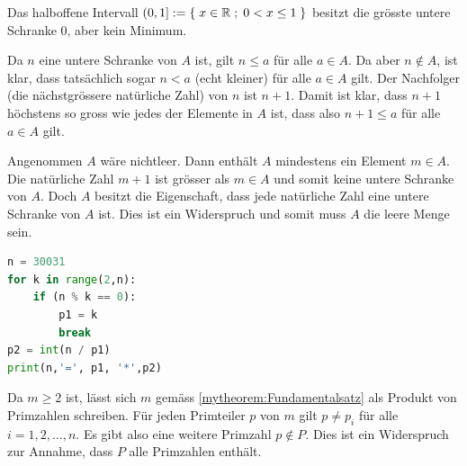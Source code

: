 \clearpage
\begin{myanswer}[myexercise:0298]
	Das halboffene Intervall $\left(0, 1\right] := \left\{\;x\in\mathbb{R} \; ; \; 0<x\leq 1 \;\right\}$ besitzt die grösste untere Schranke $0$, aber kein Minimum.
\end{myanswer}

\begin{myanswer}[myexercise:0297]
	\begin{aenum}
		\item Da $n$ eine untere Schranke von $A$ ist, gilt $n\leq a$ für alle $a\in A$.
		Da aber $n\notin A$, ist klar, dass tatsächlich sogar $n < a$ (echt kleiner) für alle $a\in A$ gilt.
		Der Nachfolger (die nächstgrössere natürliche Zahl) von $n$ ist $n+1$.
		Damit ist klar, dass $n+1$ höchstens so gross wie jedes der Elemente in $A$ ist, dass also $n+1 \leq a$ für alle $a\in A$ gilt.
		\item Angenommen $A$ wäre nichtleer.
		Dann enthält $A$ mindestens ein Element $m\in A$.
		Die natürliche Zahl $m+1$ ist grösser als $m\in A$ und somit keine untere Schranke von $A$.
		Doch $A$ besitzt die Eigenschaft, dass jede natürliche Zahl eine untere Schranke von $A$ ist.
		Dies ist ein Widerspruch und somit muss $A$ die leere Menge sein.
	\end{aenum}
\end{myanswer}
\begin{myanswer}[myexercise:0293]
	\begin{lstlisting}[language=Python]
n = 30031
for k in range(2,n):
    if (n % k == 0):
        p1 = k
        break
p2 = int(n / p1)
print(n,'=', p1, '*',p2)
\end{lstlisting}
\end{myanswer}

\begin{myanswer}[myexercise:0292]
	Da $m\geq 2$ ist, lässt sich $m$ gemäss \cref{mytheorem:Fundamentalsatz} als Produkt von Primzahlen schreiben. Für jeden Primteiler $p$ von $m$ gilt $p\neq p_i$ für alle $i=1,2,\ldots , n$. Es gibt also eine weitere Primzahl $p\notin P$. Dies ist ein Widerspruch zur Annahme, dass $P$ alle Primzahlen enthält.
\end{myanswer}

